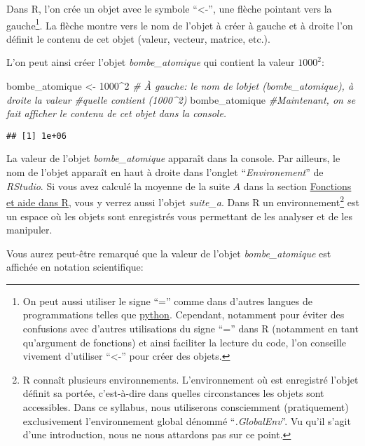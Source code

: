 \documentclass[
]{book}
\newenvironment{Shaded}{\begin{snugshade}}{\end{snugshade}}
\newcommand{\CommentTok}[1]{\textcolor[rgb]{0.56,0.35,0.01}{\textit{#1}}}
\newcommand{\DecValTok}[1]{\textcolor[rgb]{0.00,0.00,0.81}{#1}}
\newcommand{\NormalTok}[1]{#1}
\newcommand{\OtherTok}[1]{\textcolor[rgb]{0.56,0.35,0.01}{#1}}
\newcommand{\SpecialCharTok}[1]{\textcolor[rgb]{0.00,0.00,0.00}{#1}}
\begin{document}
Dans R, l'on crée un objet avec le symbole ``\textless-'', une flèche pointant vers la gauche\footnote{On peut aussi utiliser le signe ``='' comme dans d'autres langues de programmations telles que \href{https://www.python.org/}{python}. Cependant, notamment pour éviter des confusions avec d'autres utilisations du signe ``='' dans R (notamment en tant qu'argument de fonctions) et ainsi faciliter la lecture du code, l'on conseille vivement d'utiliser ``\textless-'' pour créer des objets.}. La flèche montre vers le nom de l'objet à créer à gauche et à droite l'on définit le contenu de cet objet (valeur, vecteur, matrice, etc.).

L'on peut ainsi créer l'objet \emph{bombe\_atomique} qui contient la valeur \(1000^2\):

\begin{Shaded}
\begin{Highlighting}[]
\NormalTok{bombe\_atomique }\OtherTok{\textless{}{-}} \DecValTok{1000}\SpecialCharTok{\^{}}\DecValTok{2} \CommentTok{\# À gauche: le nom de l\textquotesingle{}objet (bombe\_atomique), à droite la valeur}
                         \CommentTok{\#qu\textquotesingle{}elle contient (1000\^{}2)}
\NormalTok{bombe\_atomique           }\CommentTok{\#Maintenant, on se fait afficher le contenu de cet objet dans la console.}
\end{Highlighting}
\end{Shaded}

\begin{verbatim}
## [1] 1e+06
\end{verbatim}

La valeur de l'objet \emph{bombe\_atomique} apparaît dans la console. Par ailleurs, le nom de l'objet apparaît en haut à droite dans l'onglet ``\emph{Environement}'' de \emph{RStudio}. Si vous avez calculé la moyenne de la suite \(A\) dans la section \protect\hyperlink{Fonctions_aides}{Fonctions et aide dans R}, vous y verrez aussi l'objet \emph{suite\_a}. Dans R un environnement\footnote{R connaît plusieurs environnements. L'environnement où est enregistré l'objet définit sa portée, c'est-à-dire dans quelles circonstances les objets sont accessibles. Dans ce syllabus, nous utiliserons consciemment (pratiquement) exclusivement l'environnement global dénommé ``\emph{.GlobalEnv}''. Vu qu'il s'agit d'une introduction, nous ne nous attardons pas sur ce point.} est un espace où les objets sont enregistrés vous permettant de les analyser et de les manipuler.

Vous aurez peut-être remarqué que la valeur de l'objet \emph{bombe\_atomique} est affichée en notation scientifique:
\end{document}
